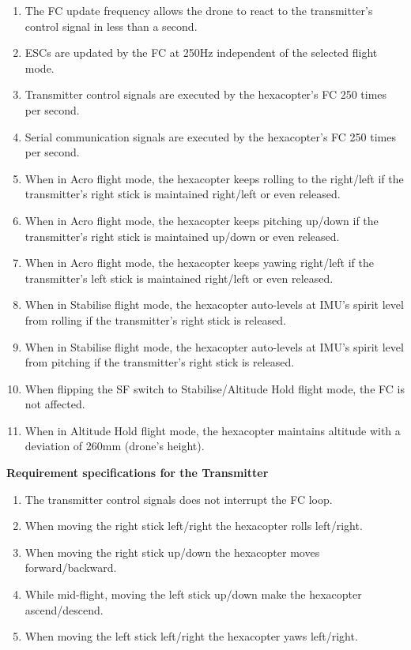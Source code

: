 \begin{enumerate}
    \item The FC update frequency allows the drone to react to the transmitter's control signal in less than a second. 
    \item ESCs are updated by the FC at 250Hz independent of the selected flight mode.
    \item Transmitter control signals are executed by the hexacopter's FC 250 times per second.
    \item Serial communication signals are executed by the hexacopter's FC 250 times per second.
    \item When in Acro flight mode, the hexacopter keeps rolling to the right/left if the transmitter's right stick is maintained right/left or even released. 
    \item When in Acro flight mode, the hexacopter keeps pitching up/down if the transmitter's right stick is maintained up/down or even released. 
    \item When in Acro flight mode, the hexacopter keeps yawing right/left if the transmitter's left stick is maintained right/left or even released. 
    \item When in Stabilise flight mode, the hexacopter auto-levels at IMU's spirit level from rolling if the transmitter's right stick is released. 
    \item When in Stabilise flight mode, the hexacopter auto-levels at IMU's spirit level from pitching if the transmitter's right stick is released. 
    \item When flipping the SF switch to Stabilise/Altitude Hold flight mode, the FC is not affected.
    \item When in Altitude Hold flight mode, the hexacopter maintains altitude with a deviation of 260mm (drone's height).
\end{enumerate}

\noindent \textbf{Requirement specifications for the Transmitter}

\begin{enumerate}
    \item The transmitter control signals does not interrupt the FC loop.
    \item When moving the right stick left/right the hexacopter rolls left/right.
    \item When moving the right stick up/down the hexacopter moves forward/backward.
    \item While mid-flight, moving the left stick up/down make the hexacopter ascend/descend.
    \item When moving the left stick left/right the hexacopter yaws left/right.
\end{enumerate}

